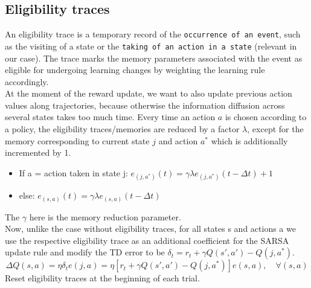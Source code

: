 \documentclass[11pt]{article}
\begin{document}
\subsection{Eligibility traces}
An eligibility trace is a temporary record of the \texttt{occurrence of an event}, such as the visiting of a state or the \texttt{taking of an action in a state} (relevant in our case). The trace marks the memory parameters associated with the event as eligible for undergoing learning changes by weighting the learning rule accordingly.\\ 
At the moment of the reward update, we want to also update previous action values along trajectories, because otherwise the information diffusion across several states takes too much time.
Every time an action $a$ is chosen according to a policy, the eligibility traces/memories are reduced by a factor $\lambda$, except for the memory corresponding to current state $j$ and action $a^*$ which is additionally incremented by 1.
\begin{itemize}
	\item If a = action taken in state j: $e_{(j,a^*)}(t) = \gamma\lambda e_{(j,a^*)}(t-\Delta t) + 1$
	\item else: $e_{(s,a)}(t) = \gamma \lambda e_{(s,a)}(t-\Delta t)$ 
\end{itemize}
The $\gamma$ here is the memory reduction parameter.\\
Now, unlike the case without eligibility traces, for all states s and actions a we use the respective eligibility trace as an additional coefficient for the SARSA update rule and modify the TD error to be $\delta_t=r_t+\gamma Q(s',a')-Q(j,a^*)$.
\[
	\Delta Q(s,a) = \eta \delta_t e(j,a)= \eta \left[r_t+\gamma Q(s',a')-Q(j,a^*)\right]e(s,a),\quad \forall(s,a)
\]
Reset eligibility traces at the beginning of each trial.
\end{document}
